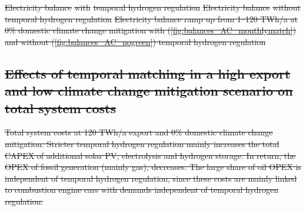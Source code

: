 \documentclass[5p,numafflabel]{elsarticle}
\def\runstandard{decr_13_3H_ws} %
\def\runsensnogreenhy{decr_14_3H_ws}
\providecommand{\DIFdeltex}[1]{{\protect\color{red}\sout{#1}}}                      %
\providecommand{\DIFdelFL}[1]{\DIFdel{#1}} %
\providecommand{\DIFdel}[1]{\texorpdfstring{\DIFdeltex{#1}}{}} %
\begin{document}
{%
\DIFdelFL{Electricity balance }%
\DIFdelFL{with}%
\DIFdelFL{temporal hydrogen regulation}}
{%
\DIFdelFL{Electricity balance }%
\DIFdelFL{without}%
\DIFdelFL{temporal hydrogen regulation}}
{%
\DIFdelFL{Electricity balance ramp up from 1--120 TWh/a at 0\% domestic climate change mitigation with (\ref{fig:balances_AC_monthlymatch}) and without (\ref{fig:balances_AC_nogreen}) temporal hydrogen regulation}}

\subsection{\DIFdel{Effects of temporal matching in a high export and low climate change mitigation scenario on total system costs}}
\addtocounter{subsection}{-1}%

{%
\DIFdelFL{Total system costs at 120 TWh/a export and 0\% domestic climate change mitigation. Stricter temporal hydrogen regulation mainly increases the total CAPEX of additional solar PV, electrolysis and hydrogen storage. In return, the OPEX of fossil generation (mainly gas), decreases. The large share of oil OPEX is independent of temporal hydrogen regulation, since these costs are mainly linked to combustion engine cars with demands independent of temporal hydrogen regulation.}}
\end{document}
